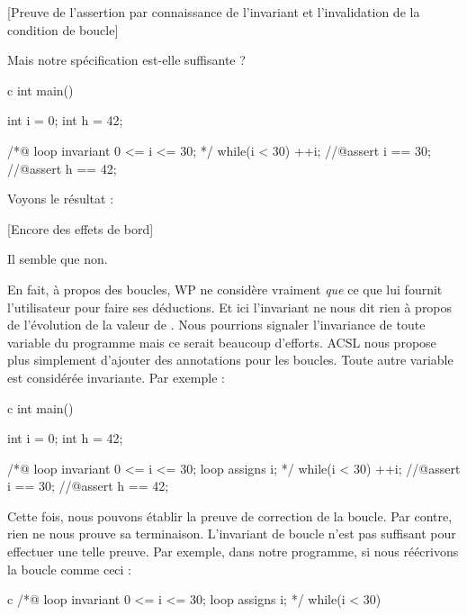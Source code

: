 [Preuve de l'assertion par connaissance de l'invariant et l'invalidation de la condition de boucle]


Mais notre spécification est-elle suffisante ?



\begin{CodeBlock}{c}
int main(){
  int i = 0;
  int h = 42;
  
  /*@
    loop invariant 0 <= i <= 30;
  */
  while(i < 30){
    ++i;
  }
  //@assert i == 30;
  //@assert h == 42;
}
\end{CodeBlock}



Voyons le résultat :



[Encore des effets de bord]


Il semble que non.





En fait, à propos des boucles, WP ne considère vraiment \textit{que} ce que lui 
fournit l'utilisateur pour faire ses déductions. Et ici l'invariant ne nous dit
rien à propos de l'évolution de la valeur de . Nous pourrions signaler 
l'invariance de toute variable du programme mais ce serait beaucoup d'efforts. 
ACSL nous propose plus simplement d'ajouter des annotations  pour 
les boucles. Toute autre variable est considérée invariante. Par exemple :



\begin{CodeBlock}{c}
int main(){
  int i = 0;
  int h = 42;
  
  /*@
    loop invariant 0 <= i <= 30;
    loop assigns i;
  */
  while(i < 30){
    ++i;
  }
  //@assert i == 30;
  //@assert h == 42;
}
\end{CodeBlock}



Cette fois, nous pouvons établir la preuve de correction de la boucle. Par contre, 
rien ne nous prouve sa terminaison. L'invariant de boucle n'est pas suffisant pour 
effectuer une telle preuve. Par exemple, dans notre programme, si nous réécrivons 
la boucle comme ceci :



\begin{CodeBlock}{c}
/*@
  loop invariant 0 <= i <= 30;
  loop assigns i;
*/
while(i < 30){
   
}
\end{CodeBlock}



